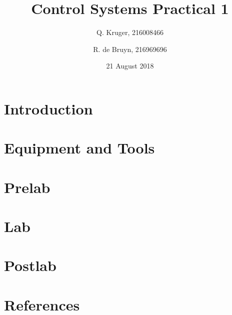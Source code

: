 \documentclass[12pt, a4paper]{article}
\title{Control Systems Practical 1}
\date{21 August 2018}
\author{Q. Kruger, 216008466 \and R. de Bruyn, 216969696}
\begin{document}
	\maketitle
	\newpage
	\tableofcontents
	\newpage
	
	\section{Introduction} %
	\label{sec:introduction}
		

	\section{Equipment and Tools} %
	\label{sec:equipment_and_tools}
		

	\section{Prelab} %
	\label{sec:prelab}
		

	\section{Lab} %
	\label{sec:lab}
		

	\section{Postlab} %
	\label{sec:postlab}
		

	\section{References} %
	\label{sec:references}
		
\end{document}

